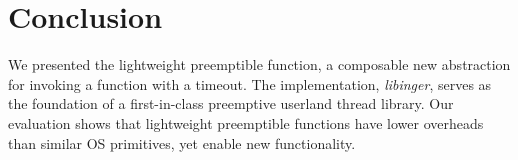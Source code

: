 \section{Conclusion}

We presented the lightweight preemptible function, a composable new abstraction
for invoking a function with a timeout.  The implementation, \textit{libinger},
serves as the foundation of
a first-in-class preemptive userland thread library.  Our evaluation shows that
lightweight
preemptible functions have lower overheads than similar OS primitives, yet
enable new functionality.
